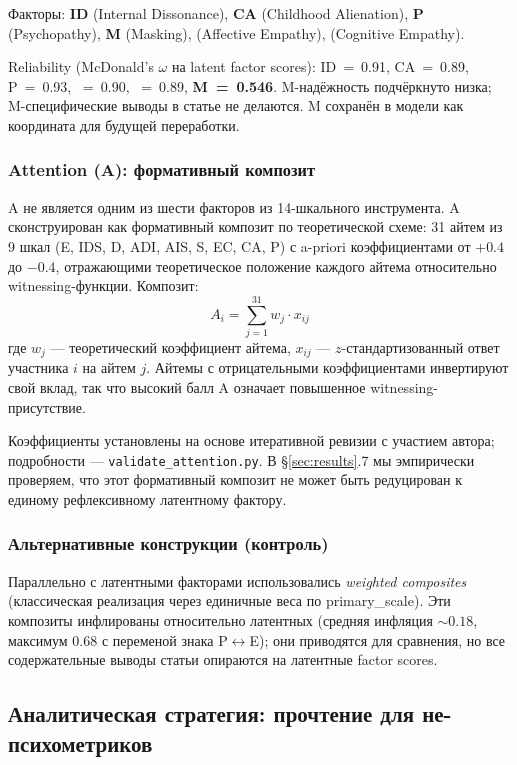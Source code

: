 Факторы: \textbf{ID} (Internal Dissonance), \textbf{CA} (Childhood Alienation), \textbf{P} (Psychopathy), \textbf{M} (Masking), \textbf{\EAF{}} (Affective Empathy), \textbf{\Ecog{}} (Cognitive Empathy).

Reliability (McDonald's $\omega$ на latent factor scores): ID~=~0.91, CA~=~0.89, P~=~0.93, \EAF{}~=~0.90, \Ecog{}~=~0.89, \textbf{M~=~0.546}. M-надёжность подчёркнуто низка; M-специфические выводы в статье не делаются. M сохранён в модели как координата для будущей переработки.

\subsubsection{Attention (A): формативный композит}

A не является одним из шести факторов из 14-шкального инструмента. A сконструирован как формативный композит по теоретической схеме: 31 айтем из 9 шкал (E, IDS, D, ADI, AIS, S, EC, CA, P) с a-priori коэффициентами от $+0.4$ до $-0.4$, отражающими теоретическое положение каждого айтема относительно witnessing-функции. Композит:
\[
A_i = \sum_{j=1}^{31} w_j \cdot x_{ij}
\]
где $w_j$ --- теоретический коэффициент айтема, $x_{ij}$ --- $z$-стандартизованный ответ участника $i$ на айтем $j$. Айтемы с отрицательными коэффициентами инвертируют свой вклад, так что высокий балл A означает повышенное witnessing-присутствие.

Коэффициенты установлены на основе итеративной ревизии с участием автора; подробности --- \texttt{validate\_attention.py}. В §\ref{sec:results}.7 мы эмпирически проверяем, что этот формативный композит не может быть редуцирован к единому рефлексивному латентному фактору.

\subsubsection{Альтернативные конструкции (контроль)}

Параллельно с латентными факторами использовались \emph{weighted composites} (классическая реализация через единичные веса по primary\_scale). Эти композиты инфлированы относительно латентных (средняя инфляция $\sim 0.18$, максимум $0.68$ с переменой знака P$\leftrightarrow$E); они приводятся для сравнения, но все содержательные выводы статьи опираются на латентные factor scores.

\subsection{Аналитическая стратегия: прочтение для не-психометриков}
\label{subsec:analytic_primer}

